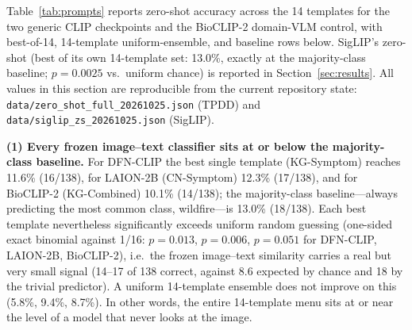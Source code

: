 \documentclass[10pt,a4paper]{article}
\begin{document}
Table~\ref{tab:prompts} reports zero-shot accuracy across the 14 templates for the two generic CLIP checkpoints and the BioCLIP-2 domain-VLM control, with best-of-14, 14-template uniform-ensemble, and baseline rows below. SigLIP's zero-shot (best of its own 14-template set: 13.0\%, exactly at the majority-class baseline; $p=0.0025$ vs.\ uniform chance) is reported in Section~\ref{sec:results}. All values in this section are reproducible from the current repository state: \texttt{data/zero\_shot\_full\_20261025.json} (TPDD) and \texttt{data/siglip\_zs\_20261025.json} (SigLIP).

\textbf{(1) Every frozen image--text classifier sits at or below the majority-class baseline.}
For DFN-CLIP the best single template (KG-Symptom) reaches 11.6\% (16/138), for LAION-2B (CN-Symptom) 12.3\% (17/138), and for BioCLIP-2 (KG-Combined) 10.1\% (14/138); the majority-class baseline---always predicting the most common class, wildfire---is 13.0\% (18/138).
Each best template nevertheless significantly exceeds uniform random guessing (one-sided exact binomial against 1/16: $p=0.013$, $p=0.006$, $p=0.051$ for DFN-CLIP, LAION-2B, BioCLIP-2), i.e.\ the frozen image--text similarity carries a real but very small signal (14--17 of 138 correct, against 8.6 expected by chance and 18 by the trivial predictor).
A uniform 14-template ensemble does not improve on this (5.8\%, 9.4\%, 8.7\%).
In other words, the entire 14-template menu sits at or near the level of a model that never looks at the image.
\end{document}

